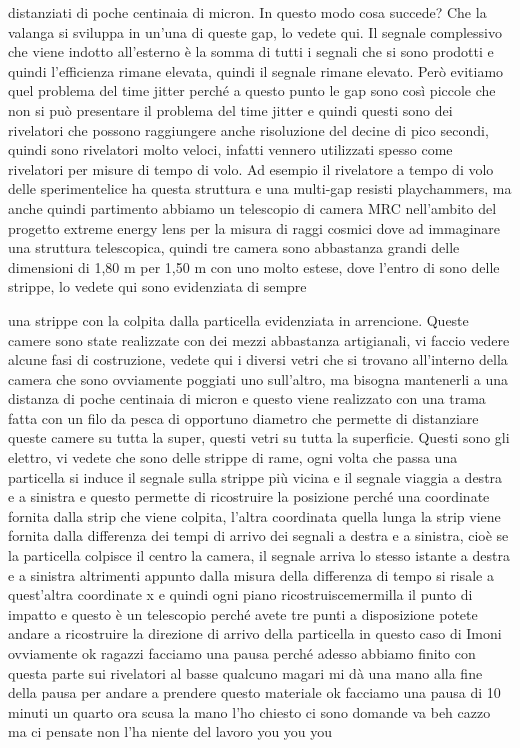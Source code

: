 {distanziati di poche centinaia di micron. In questo modo cosa succede? Che la valanga si sviluppa in un'una di queste gap, lo vedete qui. Il segnale complessivo che viene indotto all'esterno è la somma di tutti i segnali che si sono prodotti e quindi l'efficienza rimane elevata, quindi il segnale rimane elevato. Però evitiamo quel problema del time jitter perché a questo punto le gap sono così piccole che non si può presentare il problema del time jitter e quindi questi sono dei rivelatori che possono raggiungere anche risoluzione del decine di pico secondi, quindi sono rivelatori molto veloci, infatti vennero utilizzati spesso come rivelatori per misure di tempo di volo. Ad esempio il rivelatore a tempo di volo delle sperimentelice ha questa struttura e una multi-gap resisti playchammers, ma anche quindi partimento abbiamo un telescopio di camera MRC nell'ambito del progetto extreme energy lens per la misura di raggi cosmici dove ad immaginare una struttura telescopica, quindi tre camera sono abbastanza grandi delle dimensioni di 1,80 m per 1,50 m con uno molto estese, dove l'entro di sono delle strippe, lo vedete qui sono evidenziata di sempre 


una strippe con la colpita dalla particella evidenziata in arrencione. Queste camere sono state realizzate con dei mezzi abbastanza artigianali, vi faccio vedere alcune fasi di costruzione, vedete qui i diversi vetri che si trovano all'interno della camera che sono ovviamente poggiati uno sull'altro, ma bisogna mantenerli a una distanza di poche centinaia di micron e questo viene realizzato con una trama fatta con un filo da pesca di opportuno diametro che permette di distanziare queste camere su tutta la super, questi vetri su tutta la superficie. Questi sono gli elettro, vi vedete che sono delle strippe di rame, ogni volta che passa una particella si induce il segnale sulla strippe più vicina e il segnale viaggia a destra e a sinistra e questo permette di ricostruire la posizione perché una coordinate fornita dalla strip che viene colpita, l'altra coordinata quella lunga la strip viene fornita dalla differenza dei tempi di arrivo dei segnali a destra e a sinistra, cioè se la particella colpisce il centro la camera, il segnale arriva lo stesso istante a destra e a sinistra altrimenti appunto dalla misura della differenza di tempo si risale a quest'altra coordinate x e quindi ogni piano ricostruiscemermilla il punto di impatto e questo è un telescopio perché avete tre punti a disposizione potete andare a ricostruire la direzione di arrivo della particella in questo caso di Imoni ovviamente ok ragazzi facciamo una pausa perché adesso abbiamo finito con questa parte sui rivelatori al basse qualcuno magari mi dà una mano alla fine della pausa per andare a prendere questo materiale ok facciamo una pausa di 10 minuti un quarto ora scusa la mano l'ho chiesto ci sono domande va beh cazzo ma ci pensate non l'ha niente del lavoro you you you


}
